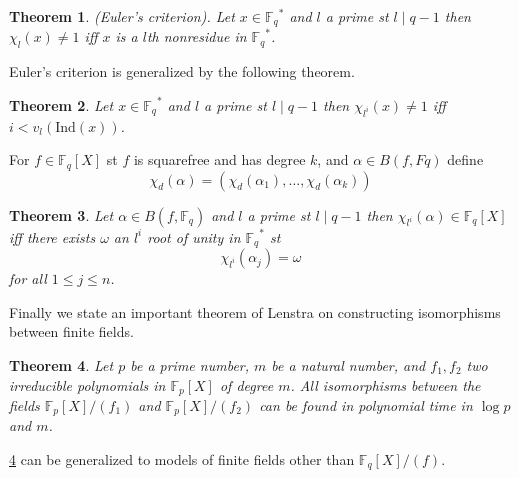 \documentclass[a4paper]{article}
\newtheorem{thm}{Theorem}[section]
\def\Fp {{ \mathbb{F} _ {p} }}
\def\Fq {{ \mathbb{F} _ {q} }}
\def\Ind {{ \mathrm{Ind} }}
\begin{document}
\begin{thm}
(Euler's criterion). Let $x \in \Fq^*$ and $l$ a prime st $l \mid q -1$ then $\chi_l(x) \not= 1$ iff $x$ is a $l$th nonresidue in $\Fq^*$.
\end{thm}

Euler's criterion is generalized by the following theorem.

\begin{thm} 
Let $x \in \Fq^*$ and $l$ a prime st $l \mid q-1$ then $\chi_{l^i}(x) \not= 1$ iff $i < v_l(\Ind(x))$.
\end{thm}

For $f \in \Fq[X]$ st $f$ is squarefree and has degree $k$, and $\alpha \in B(f, Fq)$ define
$$\chi_d(\alpha) = (\chi_d(\alpha_1), \dots, \chi_d(\alpha_k))$$

\begin{thm}
Let $\alpha \in B(f, \Fq)$ and $l$ a prime st $l \mid q - 1$ then $\chi_{l^i}(\alpha) \in \Fq[X]$ iff there exists $\omega$ an $l^i$ root of unity in $\Fq^*$ st
$$\chi_{l^i}(\alpha_j)=\omega$$
for all $1 \leq j \leq n$. 
\end{thm}

Finally we state an important theorem of Lenstra on constructing isomorphisms between finite fields.

\begin{thm} 
\label{constructingIsomorph}
Let $p$ be a prime number, $m$ be a natural number, and $f_1, f_2$ two irreducible polynomials in $\Fp[X]$ of degree $m$. All isomorphisms between the fields $\Fp[X]/(f_1)$ and $\Fp[X]/(f_2)$ can be found in polynomial time in $\log p$ and $m$.
\end{thm}

\ref{constructingIsomorph} can be generalized to models of finite fields other than $\Fq[X]/(f)$.
\end{document}

